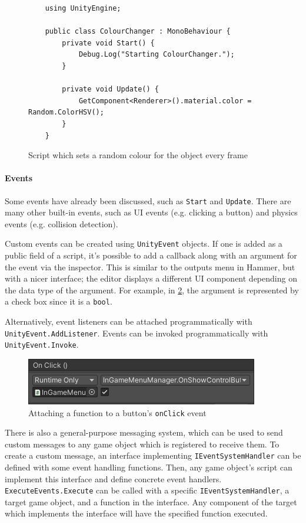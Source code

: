 \documentclass[a4paper, 12pt]{scrartcl}
\begin{document}
\begin{figure}[!ht]
  \begin{verbatim}
    using UnityEngine;

    public class ColourChanger : MonoBehaviour {
        private void Start() {
            Debug.Log("Starting ColourChanger.");
        }

        private void Update() {
            GetComponent<Renderer>().material.color = Random.ColorHSV();
        }
    }
  \end{verbatim}
  \caption{Script which sets a random colour for the object every frame}
  \label{fig:unity_script}
\end{figure}

\paragraph{Events}
Some events have already been discussed, such as \texttt{Start} and \texttt{Update}. There are many other built-in events, such as UI events (e.g. clicking a button) and physics events (e.g. collision detection).

Custom events can be created using \texttt{UnityEvent} objects. If one is added as a public field of a script, it's possible to add a callback along with an argument for the event via the inspector. This is similar to the outputs menu in Hammer, but with a nicer interface; the editor displays a different UI component depending on the data type of the argument. For example, in \cref{fig:unity_event_inspector}, the argument is represented by a check box since it is a \texttt{bool}.

Alternatively, event listeners can be attached programmatically with \texttt{UnityEvent\-.AddListener}. Events can be invoked programmatically with \texttt{UnityEvent.Invoke}.

\begin{figure}[!ht]
  \centering
  \includegraphics[scale=0.75]{images/unity_event_inspector.png}
  \caption{Attaching a function to a button's \texttt{onClick} event}
  \label{fig:unity_event_inspector}
\end{figure}

There is also a general-purpose messaging system, which can be used to send custom messages to any game object which is registered to receive them. To create a custom message, an interface implementing \texttt{IEventSystemHandler} can be defined with some event handling functions. Then, any game object's script can implement this interface and define concrete event handlers. \texttt{ExecuteEvents.Execute} can be called with a specific \texttt{IEventSystemHandler}, a target game object, and a function in the interface. Any component of the target which implements the interface will have the specified function executed.
\end{document}
